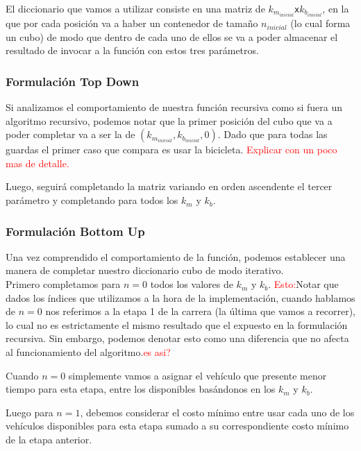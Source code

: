 El diccionario que vamos a utilizar consiste en una matriz de $k_{m_{inicial}}$\texttt{x}$k_{b_{inicial}}$, en la que por cada posici\'on va a haber un contenedor de tama\~no $n_{inicial}$ (lo cual forma un cubo) de modo que dentro de cada uno de ellos se va a poder almacenar el resultado de invocar a la funci\'on con estos tres par\'ametros.

\subsubsection*{Formulaci\'on Top Down}

	Si analizamos el comportamiento de nuestra funci\'on recursiva como si fuera un algoritmo recursivo, podemos notar que la primer posici\'on del cubo que va a poder completar va a ser la de $(k_{m_{inicial}},k_{b_{inicial}},0)$. Dado que para todas las guardas el primer caso que compara es usar la bicicleta. \textcolor{red}{Explicar con un poco mas de detalle.}

	Luego, seguir\'a completando la matriz variando en orden ascendente el tercer par\'ametro y completando para todos los $k_m$ y $k_b$.

\subsubsection*{Formulaci\'on Bottom Up}


Una vez comprendido el comportamiento de la funci\'on, podemos establecer una manera de completar nuestro diccionario cubo de modo iterativo.\\

Primero completamos para $n=0$ todos los valores de $k_m$ y $k_b$. \textcolor{red}{Esto:}Notar que dados los \'indices que utilizamos a la hora de la implementaci\'on, cuando hablamos de $n=0$ nos referimos a la etapa 1 de la carrera (la \'ultima que vamos a recorrer), lo cual no es estrictamente el mismo resultado que el expuesto en la formulaci\'on recursiva. Sin embargo, podemos denotar esto como una diferencia que no afecta al funcionamiento del algoritmo.\textcolor{red}{es asi?}

Cuando $n=0$ simplemente vamos a asignar el veh\'iculo que presente menor tiempo para esta etapa, entre los disponibles bas\'andonos en los $k_m$ y $k_b$.

Luego para $n=1$, debemos considerar el costo m\'inimo entre usar cada uno de los veh\'iculos disponibles para esta etapa sumado a su correspondiente costo m\'inimo de la etapa anterior.

